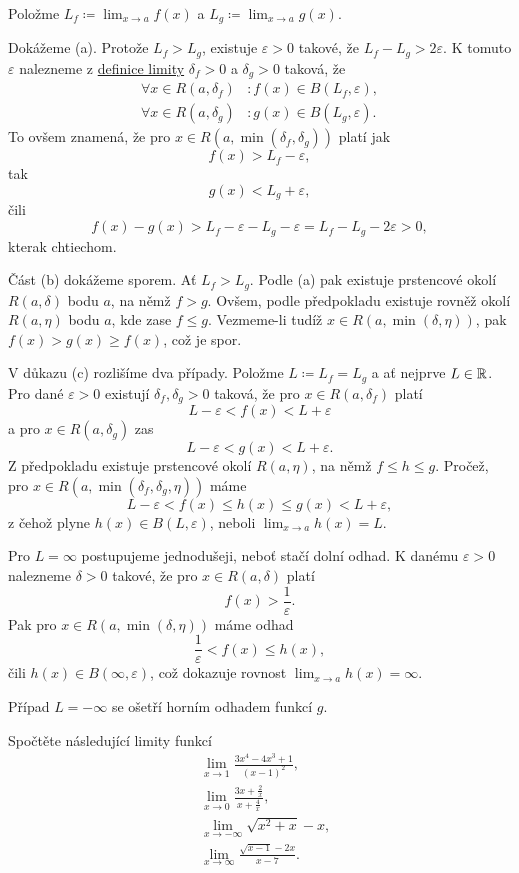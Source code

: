 \begin{thmproof}
 Položme $L_f \coloneqq \lim_{x \to a} f(x)$ a $L_g \coloneqq \lim_{x \to a}
 g(x)$.

 Dokážeme (a). Protože $L_f > L_g$, existuje $\varepsilon > 0$ takové, že $L_f -
 L_g > 2\varepsilon$. K tomuto $\varepsilon$ nalezneme z
 \hyperref[def:oboustranna-limita-funkce]{definice limity} $\delta_f > 0$ a
 $\delta_g > 0$ taková, že
 \begin{align*}
  \forall x \in R(a,\delta_f) &: f(x) \in B(L_f,\varepsilon),\\
  \forall x \in R(a,\delta_g)&: g(x) \in B(L_g,\varepsilon).
 \end{align*}
 To ovšem znamená, že pro $x \in R(a,\min(\delta_f,\delta_g))$ platí jak
 \[
  f(x) > L_f - \varepsilon,
 \]
 tak
 \[
  g(x) < L_g + \varepsilon,
 \]
 čili
 \[
  f(x) - g(x) > L_f - \varepsilon - L_g - \varepsilon = L_f - L_g - 2\varepsilon
  > 0,
 \]
 kterak chtiechom.

 Část (b) dokážeme sporem. Ať $L_f > L_g$. Podle (a) pak existuje prstencové
 okolí $R(a,\delta)$ bodu $a$, na němž $f > g$. Ovšem, podle předpokladu
 existuje rovněž okolí $R(a,\eta)$ bodu $a$, kde zase $f \leq g$. Vezmeme-li
 tudíž $x \in R(a,\min(\delta,\eta))$, pak $f(x) > g(x) \geq f(x)$, což je spor.

 V důkazu (c) rozlišíme dva případy. Položme $L \coloneqq L_f = L_g$ a ať
 nejprve $L \in \mathbb{R}$. Pro dané $\varepsilon>0$ existují $\delta_f,\delta_g>0$
 taková, že pro $x \in R(a,\delta_f)$ platí
 \[
  L - \varepsilon< f(x) < L + \varepsilon
 \]
 a pro $x \in R(a,\delta_g)$ zas
 \[
  L - \varepsilon < g(x) < L + \varepsilon.
 \]
 Z předpokladu existuje prstencové okolí $R(a,\eta)$, na němž $f \leq h \leq g$.
 Pročež, pro $x \in R(a,\min(\delta_f,\delta_g,\eta))$ máme
 \[
  L - \varepsilon < f(x) \leq h(x) \leq g(x) < L + \varepsilon,
 \]
 z čehož plyne $h(x) \in B(L,\varepsilon)$, neboli $\lim_{x \to a} h(x) = L$.

 Pro $L = \infty$ postupujeme jednodušeji, neboť stačí dolní odhad. K danému
 $\varepsilon>0$ nalezneme $\delta>0$ takové, že pro $x \in R(a,\delta)$ platí
 \[
  f(x) > \frac{1}{\varepsilon}.
 \]
 Pak pro $x \in R(a,\min(\delta,\eta))$ máme odhad
 \[
  \frac{1}{\varepsilon} < f(x) \leq h(x),
 \]
 čili $h(x) \in B(\infty,\varepsilon)$, což dokazuje rovnost $\lim_{x \to a}
 h(x) = \infty$. 

 Případ $L = -\infty$ se ošetří horním odhadem funkcí $g$.
\end{thmproof}

\begin{exercise}{}{}
 Spočtěte následující limity funkcí
 \begin{align*}
  &\lim_{x \to 1} \frac{3x^{4} - 4x^3 + 1}{(x-1)^2},\\
  &\lim_{x \to 0} \frac{3x + \frac{2}{x}}{x + \frac{4}{x}},\\
  &\lim_{x \to -\infty} \sqrt{x^2 + x} - x,\\
  &\lim_{x \to \infty} \frac{\sqrt{x-1}-2x}{x-7}.
 \end{align*}
\end{exercise}

